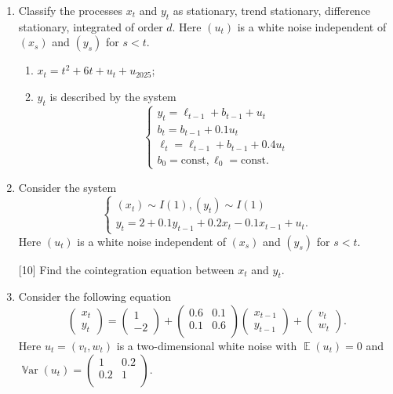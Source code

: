 \documentclass[12pt]{article}
\DeclareMathOperator{\Var}{\mathbb{V}ar}
\DeclareMathOperator{\E}{\mathbb{E}}
\newcommand{\const}{\text{const}}
\begin{document}
\begin{enumerate}
    \item Classify the processes $x_t$ and $y_t$ as stationary, trend stationary, difference stationary, integrated of order $d$.
    Here $(u_t)$ is a white noise independent of $(x_s)$ and $(y_s)$ for $s < t$.
    \begin{enumerate}
        \item $x_t = t^2 + 6t + u_t + u_{2025}$; 
        \item $y_t$ is described by the system
        \[
        \begin{cases}
            y_t = \ell_{t-1} + b_{t-1} + u_t \\
            b_t = b_{t-1} + 0.1 u_t \\
            \ell_t = \ell_{t-1} + b_{t-1} + 0.4 u_t \\
            b_0 = \const, \ell_0 = \const.
        \end{cases}
        \]
    \end{enumerate}


    \item Consider the system
    \[
    \begin{cases}
        (x_t) \sim I(1), (y_t) \sim I(1) \\
        y_t = 2 + 0.1 y_{t-1} + 0.2 x_t - 0.1 x_{t-1} + u_t.
    \end{cases}
    \]
    Here $(u_t)$ is a white noise independent of $(x_s)$ and $(y_s)$ for $s < t$.
    
    {[10]} Find the cointegration equation between $x_t$ and $y_t$.

    \item Consider the following equation 
    \[
    \begin{pmatrix}
        x_t \\
        y_t 
    \end{pmatrix} =
    \begin{pmatrix}
        1 \\
        -2
    \end{pmatrix} + 
    \begin{pmatrix}
        0.6 & 0.1 \\
        0.1 & 0.6 \\
    \end{pmatrix}
    \begin{pmatrix}
        x_{t-1} \\
        y_{t-1}
    \end{pmatrix} +
    \begin{pmatrix}
        v_t \\
        w_t
    \end{pmatrix}.
    \]
    Here $u_t = (v_t, w_t)$ is a two-dimensional white noise with $\E(u_t)=0$ and $\Var(u_t) = \begin{pmatrix}
        1 & 0.2 \\
        0.2 & 1 \\
    \end{pmatrix}$.


\end{enumerate}
\end{document}
